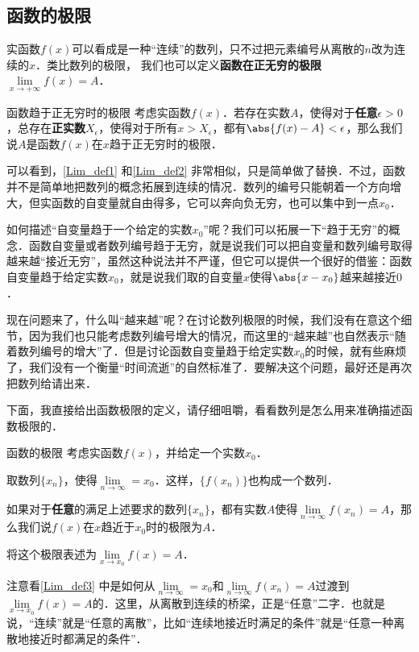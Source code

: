 \subsection{函数的极限}
实函数$f(x)$可以看成是一种“连续”的数列，只不过把元素编号从离散的$n$改为连续的$x$．类比数列的极限， 我们也可以定义\textbf{函数在正无穷的极限} $\lim\limits_{x\to +\infty} f(x) = A$．

\begin{definition}{函数趋于正无穷时的极限}\label{Lim_def1}
考虑实函数$f(x)$．若存在实数$A$，使得对于\textbf{任意}$\epsilon>0$，总存在\textbf{正实数}$X_\epsilon$，使得对于所有$x>X_\epsilon$，都有$\abs{f(x)-A}<\epsilon$，那么我们说$A$是函数$f(x)$在$x$趋于正无穷时的极限．
\end{definition}

可以看到，\autoref{Lim_def1} 和\autoref{Lim_def2} 非常相似，只是简单做了替换．不过，函数并不是简单地把数列的概念拓展到连续的情况．数列的编号只能朝着一个方向增大，但实函数的自变量就自由得多，它可以奔向负无穷，也可以集中到一点$x_0$．

如何描述“自变量趋于一个给定的实数$x_0$”呢？我们可以拓展一下“趋于无穷”的概念．函数自变量或者数列编号趋于无穷，就是说我们可以把自变量和数列编号取得越来越“接近无穷”，虽然这种说法并不严谨，但它可以提供一个很好的借鉴：函数自变量趋于给定实数$x_0$，就是说我们取的自变量$x$使得$\abs{x-x_0}$越来越接近$0$．

现在问题来了，什么叫“越来越”呢？在讨论数列极限的时候，我们没有在意这个细节，因为我们也只能考虑数列编号增大的情况，而这里的“越来越”也自然表示“随着数列编号的增大”了．但是讨论函数自变量趋于给定实数$x_0$的时候，就有些麻烦了，我们没有一个衡量“时间流逝”的自然标准了．要解决这个问题，最好还是再次把数列给请出来．

下面，我直接给出函数极限的定义，请仔细咀嚼，看看数列是怎么用来准确描述函数极限的．

\begin{definition}{函数的极限}\label{Lim_def3}
考虑实函数$f(x)$，并给定一个实数$x_0$．

取数列$\{x_n\}$，使得$\lim\limits_{n\to\infty}=x_0$．这样，$\{f(x_n)\}$也构成一个数列．

如果对于\textbf{任意}的满足上述要求的数列$\{x_n\}$，都有实数$A$使得$\lim\limits_{n\to\infty}f(x_n)=A$，那么我们说$f(x)$在$x$趋近于$x_0$时的极限为$A$．

将这个极限表述为$\lim\limits_{x\to x_0}f(x)=A$．
\end{definition}

注意看\autoref{Lim_def3} 中是如何从$\lim\limits_{n\to\infty}=x_0$和$\lim\limits_{n\to\infty}f(x_n)=A$过渡到$\lim\limits_{x\to x_0}f(x)=A$的．这里，从离散到连续的桥梁，正是“任意”二字．也就是说，“连续”就是“任意的离散”，比如“连续地接近时满足的条件”就是“任意一种离散地接近时都满足的条件”．

